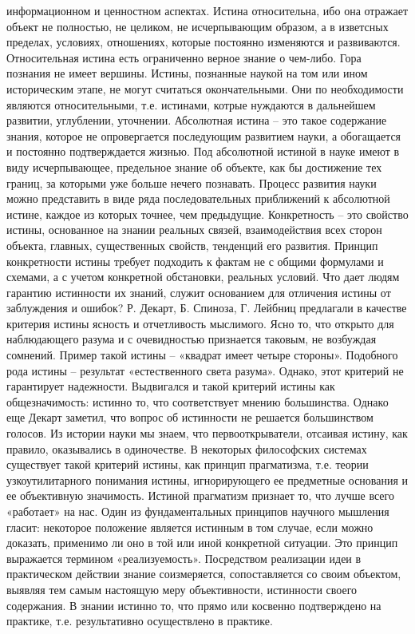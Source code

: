 \documentclass[12pt]{article}
\begin{document}
информационном и ценностном аспектах.
Истина относительна, ибо она отражает объект не полностью, не целиком, не исчерпывающим образом, а в
изветсных  пределах,  условиях, отношениях,  которые  постоянно  изменяются  и  развиваются.  Относительная
истина есть ограниченно верное знание о чем-либо. Гора познания не имеет вершины. Истины, познанные
наукой на том или ином историческим этапе, не могут считаться окончательными. Они по необходимости
являются относительными, т.е. истинами, котрые нуждаются в дальнейшем развитии, углублении, уточнении.
Абсолютная истина – это такое содержание знания, которое не опровергается последующим развитием науки, а
обогащается  и  постоянно  подтверждается  жизнью. Под  абсолютной  истиной  в  науке  имеют  в  виду
исчерпывающее, предельное знание об объекте, как бы достижение тех границ, за которыми уже больше нечего
познавать.  Процесс  развития  науки  можно  представить  в  виде  ряда  последовательных  приближений  к
абсолютной истине, каждое из которых точнее, чем предыдущие.
Конкретность – это свойство истины, основанное на знании реальных связей, взаимодействия всех сторон
объекта,  главных,  существенных  свойств,  тенденций  его  развития.  Принцип  конкретности  истины  требует
подходить к фактам не с общими формулами и схемами, а с учетом конкретной обстановки, реальных условий.
Что дает людям гарантию истинности их знаний, служит основанием для отличения истины от заблуждения и
ошибок?
Р. Декарт, Б. Спиноза, Г. Лейбниц предлагали в качестве критерия истины ясность и отчетливость мыслимого.
Ясно то, что открыто для наблюдающего разума и с очевидностью признается таковым, не возбуждая сомнений.
Пример такой истины – «квадрат имеет четыре стороны». Подобного рода истины – результат «естественного
света разума». Однако, этот критерий не гарантирует надежности.
Выдвигался  и  такой  критерий  истины  как  общезначимость:  истинно  то,  что  соответствует  мнению
большинства. Однако еще Декарт заметил, что вопрос об истинности не решается большинством голосов. Из
истории науки мы знаем, что первооткрыватели, отсаивая истину, как правило, оказывались в одиночестве.
В некоторых философских системах существует такой критерий истины, как принцип прагматизма, т.е. теории
узкоутилитарного понимания истины, игнорирующего ее предметные основания и ее объективную значимость.
Истиной прагматизм признает то, что лучше всего «работает» на нас.
Один из фундаментальных принципов научного мышления гласит: некоторое положение является истинным в
том случае, если  можно  доказать, применимо ли оно в той или  иной  конкретной ситуации. Это принцип
выражается  термином  «реализуемость».  Посредством  реализации  идеи  в  практическом  действии  знание
соизмеряется,  сопоставляется  со  своим  объектом,  выявляя  тем  самым  настоящую  меру  объективности,
истинности своего содержания. В знании истинно то, что прямо или косвенно подтверждено на практике, т.е.
результативно осуществлено в практике.
\end{document}
